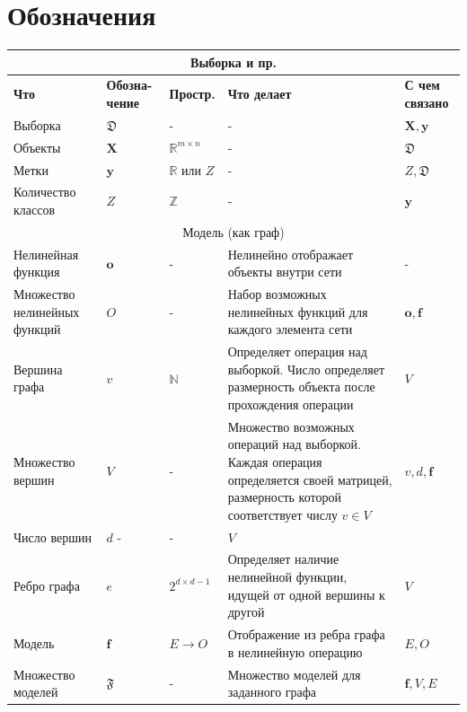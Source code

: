 \documentclass[12pt]{article}
\begin{document}
\newpage
\section{Обозначения}

\begin{table}[tbh!]
\small
\begin{tabularx}{\textwidth}{|X|p{1.5cm}|p{1.5cm}|X|p{1.5cm}|}
\hline
\multicolumn{5}{c}{Выборка и пр.}\\\hline
\bf Что & \bf Обозна- чение & \bf Простр. & \bf Что делает & \bf С чем связано  \\ \hline \hline

  Выборка & $\mathfrak{D}$ & - & - & $\mathbf{X}, \mathbf{y}$ \\ \hline
  Объекты & $\mathbf{X}$  &  $\mathbb{R}^{m \times n}$ & - & $\mathfrak{D}$   \\ \hline
  Метки & $\mathbf{y}$  &  $\mathbb{R}$ или $Z$ & - & $Z, \mathfrak{D}$   \\ \hline
  Количество классов & $Z$ & $\mathbb{Z}$ & - & $\mathbf{y}$ \\ \hline
\multicolumn{5}{c}{Модель (как граф)}\\\hline
  Нелинейная функция & $\mathbf{o}$ & - & Нелинейно отображает объекты внутри сети & - \\ \hline
  Множество нелинейных функций & $O$ & - & Набор возможных нелинейных функций для каждого элемента сети & $\mathbf{o}, \mathbf{f}$ \\ \hline
  Вершина графа & $v$ & $\mathbb{N}$ & Определяет операция над выборкой. Число определяет размерность объекта после прохождения операции & $V$ \\ \hline
  Множество вершин & $V$ & - & Множество возможных операций над выборкой. Каждая операция определяется своей матрицей, размерность которой соответствует числу $v \in V$ & $v, d, \mathbf{f}$ \\ \hline
  Число вершин & $d$ - & - & $V$ \\ \hline
  Ребро графа & $e$ & $2^{d \times {d-1}}$ & Определяет наличие нелинейной функции, идущей от одной вершины к другой & $V$ \\ \hline
  Модель & $\mathbf{f}$ & $E \to O$ & Отображение из ребра графа в нелинейную операцию & $E, O$ \\ \hline
  Множество моделей & $\mathfrak{F}$ & - & Множество моделей для заданного графа & $\mathbf{f}, V, E$ \\ \hline
  
\end{tabularx}
\end{table}
\end{document}
